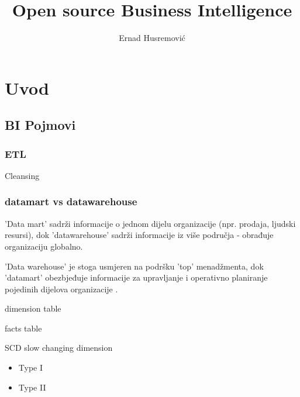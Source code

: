 \documentclass[times, utf8, seminar]{fit}
\begin{document}
\title{Open source Business Intelligence}

\author{Ernad Husremović}


\maketitle

\tableofcontents

\chapter{Uvod}

\section{BI Pojmovi}

\subsection{ETL}

Cleansing


\subsection{datamart vs datawarehouse}

'Data mart' sadrži informacije o jednom dijelu organizacije (npr. prodaja, ljudski resursi), dok 'datawarehouse' sadrži informacije iz više područja -  obrađuje organizaciju globalno. 

'Data warehouse' je stoga usmjeren na podršku 'top' menadžmenta, dok 'datamart' obezbjeđuje informacije za upravljanje i operativno planiranje pojedinih dijelova organizacije  \cite[str.~391]{pentaho32}.

dimension table

facts table

SCD slow changing dimension
\begin{itemize}
  \item Type I
  \item Type II
\end{itemize}
\end{document}
